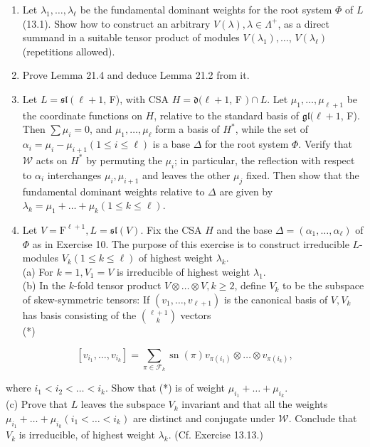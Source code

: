 \documentclass[10pt]{article}
\begin{document}
\begin{enumerate}
  \item Let $\lambda_{1}, \ldots, \lambda_{\ell}$ be the fundamental dominant weights for the root system $\Phi$ of $L$ (13.1). Show how to construct an arbitrary $V(\lambda), \lambda \in \Lambda^{+}$, as a direct summand in a suitable tensor product of modules $V\left(\lambda_{1}\right), \ldots$, $V\left(\lambda_{\ell}\right)$ (repetitions allowed).
  \item Prove Lemma 21.4 and deduce Lemma 21.2 from it.
  \item Let $L=\mathfrak{s l}\left(\ell+1\right.$, F), with CSA $H=\mathfrak{d}(\ell+1$, F $) \cap L$. Let $\mu_{1}, \ldots, \mu_{\ell+1}$ be the coordinate functions on $H$, relative to the standard basis of $\mathfrak{g l}(\ell+1$, F). Then $\sum \mu_{i}=0$, and $\mu_{1}, \ldots, \mu_{\ell}$ form a basis of $H^{*}$, while the set of $\alpha_{i}=\mu_{i}-\mu_{i+1}(1 \leq i \leq \ell)$ is a base $\Delta$ for the root system $\Phi$. Verify that $\mathscr{W}$ acts on $H^{*}$ by permuting the $\mu_{i}$; in particular, the reflection with respect to $\alpha_{i}$ interchanges $\mu_{i}, \mu_{i+1}$ and leaves the other $\mu_{j}$ fixed. Then show that the fundamental dominant weights relative to $\Delta$ are given by $\lambda_{k}=\mu_{1}+\ldots+\mu_{k}(1 \leq k \leq \ell)$.
  \item Let $V=\mathrm{F}^{\ell+1}, L=\mathfrak{s l}(V)$. Fix the CSA $H$ and the base $\Delta=\left(\alpha_{1}, \ldots, \alpha_{\ell}\right)$ of $\Phi$ as in Exercise 10. The purpose of this exercise is to construct irreducible $L$-modules $V_{k}(1 \leq k \leq \ell)$ of highest weight $\lambda_{k}$.\\
(a) For $k=1, V_{1}=V$ is irreducible of highest weight $\lambda_{1}$.\\
(b) In the $k$-fold tensor product $V \otimes \ldots \otimes V, k \geq 2$, define $V_{k}$ to be the subspace of skew-symmetric tensors: If $\left(v_{1}, \ldots, v_{\ell+1}\right)$ is the canonical basis of $V, V_{k}$ has basis consisting of the $\binom{\ell+1}{k}$ vectors\\
(*)
\end{enumerate}

$$
\left[v_{i_{1}}, \ldots, v_{i_{k}}\right]=\sum_{\pi \in \mathscr{F}_{k}} \operatorname{sn}(\pi) v_{\pi\left(i_{1}\right)} \otimes \ldots \otimes v_{\pi\left(i_{k}\right)},
$$

where $i_{1}<i_{2}<\ldots<i_{k}$. Show that (*) is of weight $\mu_{i_{1}}+\ldots+\mu_{i_{k}}$.\\
(c) Prove that $L$ leaves the subspace $V_{k}$ invariant and that all the weights $\mu_{i_{1}}+\ldots+\mu_{i_{k}}\left(i_{1}<\ldots<i_{k}\right)$ are distinct and conjugate under $\mathscr{W}$. Conclude that $V_{k}$ is irreducible, of highest weight $\lambda_{k}$. (Cf. Exercise 13.13.)
\end{document}
